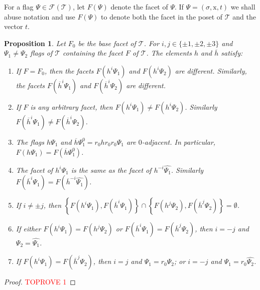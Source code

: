 \documentclass[final]{amsart}
\theoremstyle{plain}
\newtheorem{prop}[thm]{Proposition}
\theoremstyle{definition}
\theoremstyle{remark}
\numberwithin{equation}{section}
\renewcommand{\{}{\lbrace}
\renewcommand{\}}{\rbrace}
\renewcommand{\bar}{\overline}
\renewcommand{\hat}{\widehat}
\newcommand{\cF}{\mathcal{F}}
\newcommand{\cT}{\mathcal{T}}
\newcommand{\cyvec}[1]{{\mathrm{#1}}}
\newcommand{\vx}{\cyvec{x}}
\newcommand{\kng}{{h}}
\newcommand{\etab}{\bar{\kng}}
\begin{document}
 For a flag $\Psi \in \cF(\cT)$, let $F(\Psi)$ denote the facet of $\Psi$.
 If $\Psi = (\sigma, \vx, t)$ we shall abuse notation and use $F(\Psi)$ to denote both the facet in the poset of $\cT$ and the vector $t$.


\begin{prop} \label{prop:etaIsGood}
Let $F_{0}$ be the base facet of $\cT$.
For $i,j \in \{\pm1, \pm 2, \pm 3\}$ and $\Psi_{1} \neq \Psi_{2}$ flags of $\cT$ containing the facet $F$ of $\cT$. 
The elements $\kng$ and $\etab$ satisfy:
\begin{enumerate}
    \item \label{item:baseFacet} If $F = F_{0}$, then the facets $F(\kng^{i} \Psi_{1})$ and $F(\kng^{i} \Psi_{2})$ are different.
    Similarly, the facets  $F(\etab^{i} \Psi_{1})$ and $F(\etab^{i} \Psi_{2})$ are different.
    \item \label{item:anyFacet} If $F$ is any arbitrary facet, then $F(\kng^{i} \Psi_{1}) \neq F(\kng^{i} \Psi_{2})$.
    Similarly $F(\etab^{i} \Psi_{1}) \neq F(\etab^{i} \Psi_{2})$.
    \item \label{item:barEta} The flags $\kng \Psi_{1}$ and $\etab \Psi_{1}^{0}=r_0 \kng r_0 r_0 \Psi_{1}$ are $0$-adjacent.
    In particular, $F(\kng \Psi_{1}) = F(\etab\Psi_{1}^{0})$.
\item \label{item:Antipoda} The facet of $\kng^{i} \Psi_{1}$ is the same as the facet of $\kng^{-i} \hat{\Psi_{1}} $.
    Similarly $F(\etab^{i} \Psi_{1}) = F(\etab^{-i} \hat{\Psi_{1}})$.
    \item \label{item:NMA} If $i \neq \pm j$, then $\left\{F(\kng^{i} \Psi_{1}), F(\etab^{i} \Psi_{1})\right\} \cap \left\{ F(\kng^{j} \Psi_{2}), F(\etab^{j}\Psi_{2}) \right\} = \emptyset$.
    \item \label{item:esAntipoda} If 
either $F(\kng^{i} \Psi_{1}) = F(\kng^{j} \Psi_{2}) $ or $F(\etab^{i} \Psi_{1}) = F(\etab^{j} \Psi_{2}) $, then $i = -j$ and $\Psi_{2}=\hat{\Psi_{1}}$.
    \item \label{item:esVecina} If 
$F(\kng^{i} \Psi_{1}) = F(\etab^{j} \Psi_{2}) $, then $i=j$ and $\Psi_{1} = r_{0}\Psi_{2}$; or $i = -j$ and $\Psi_{1}=r_0 \hat{\Psi_{2}}$. 


    

\end{enumerate}
\end{prop}
\begin{proof}\textcolor{red}{TOPROVE 1}\end{proof}
\end{document}
